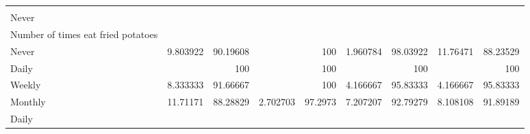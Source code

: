\documentclass{article}
\begin{document}
\begin{tabular}{lllllllll}
  \multicolumn{1}{|r}{} &
  \multicolumn{1}{r}{} &
  \multicolumn{1}{r}{} &
  \multicolumn{1}{r}{} &
  \multicolumn{1}{r}{} &
  \multicolumn{1}{r}{} &
  \multicolumn{1}{r}{} &
  \multicolumn{1}{r}{} \\
\multicolumn{1}{l}{\hspace{5em}Never} &
  \multicolumn{1}{|r}{} &
  \multicolumn{1}{r}{} &
  \multicolumn{1}{r}{} &
  \multicolumn{1}{r}{} &
  \multicolumn{1}{r}{} &
  \multicolumn{1}{r}{} &
  \multicolumn{1}{r}{} &
  \multicolumn{1}{r}{} \\
\multicolumn{1}{l}{\hspace{6em}Number of times eat fried potatoes} &
  \multicolumn{1}{|r}{} &
  \multicolumn{1}{r}{} &
  \multicolumn{1}{r}{} &
  \multicolumn{1}{r}{} &
  \multicolumn{1}{r}{} &
  \multicolumn{1}{r}{} &
  \multicolumn{1}{r}{} &
  \multicolumn{1}{r}{} \\
\multicolumn{1}{l}{\hspace{7em}Never} &
  \multicolumn{1}{|r}{9.803922} &
  \multicolumn{1}{r}{90.19608} &
  \multicolumn{1}{r}{} &
  \multicolumn{1}{r}{100} &
  \multicolumn{1}{r}{1.960784} &
  \multicolumn{1}{r}{98.03922} &
  \multicolumn{1}{r}{11.76471} &
  \multicolumn{1}{r}{88.23529} \\
\multicolumn{1}{l}{\hspace{7em}Daily} &
  \multicolumn{1}{|r}{} &
  \multicolumn{1}{r}{100} &
  \multicolumn{1}{r}{} &
  \multicolumn{1}{r}{100} &
  \multicolumn{1}{r}{} &
  \multicolumn{1}{r}{100} &
  \multicolumn{1}{r}{} &
  \multicolumn{1}{r}{100} \\
\multicolumn{1}{l}{\hspace{7em}Weekly} &
  \multicolumn{1}{|r}{8.333333} &
  \multicolumn{1}{r}{91.66667} &
  \multicolumn{1}{r}{} &
  \multicolumn{1}{r}{100} &
  \multicolumn{1}{r}{4.166667} &
  \multicolumn{1}{r}{95.83333} &
  \multicolumn{1}{r}{4.166667} &
  \multicolumn{1}{r}{95.83333} \\
\multicolumn{1}{l}{\hspace{7em}Monthly} &
  \multicolumn{1}{|r}{11.71171} &
  \multicolumn{1}{r}{88.28829} &
  \multicolumn{1}{r}{2.702703} &
  \multicolumn{1}{r}{97.2973} &
  \multicolumn{1}{r}{7.207207} &
  \multicolumn{1}{r}{92.79279} &
  \multicolumn{1}{r}{8.108108} &
  \multicolumn{1}{r}{91.89189} \\
\multicolumn{1}{l}{\hspace{5em}Daily} &
  \multicolumn{1}{|r}{} &
  \multicolumn{1}{r}{} &
  \multicolumn{1}{r}{} &
  \multicolumn{1}{r}{} &
  \multicolumn{1}{r}{} &
  \multicolumn{1}{r}{} &

\end{tabular}
\end{document}

